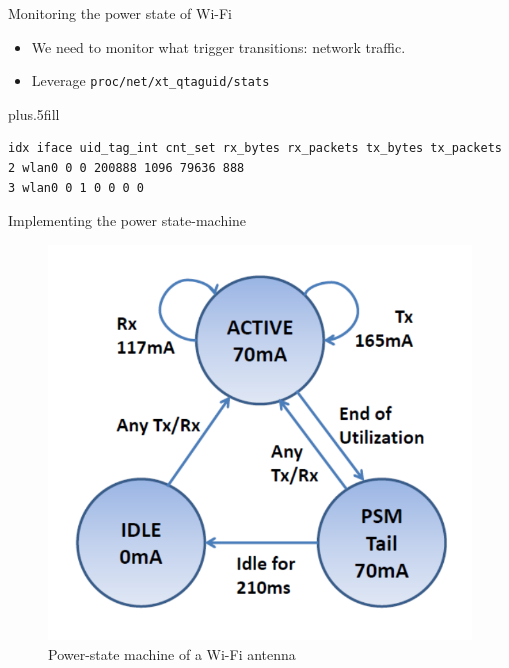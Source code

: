 %
%
\begin{frame}[fragile]{Monitoring the power state of Wi-Fi}
\begin{itemize}
\item We need to monitor what trigger transitions: \alert{network traffic}.
\item Leverage \texttt{proc/net/xt\_qtaguid/stats}
\end{itemize}
\vskip0pt plus.5fill
\begin{lstlisting}
idx iface uid_tag_int cnt_set rx_bytes rx_packets tx_bytes tx_packets
2 wlan0 0 0 200888 1096 79636 888
3 wlan0 0 1 0 0 0 0
\end{lstlisting}
\end{frame}
%
%
\begin{frame}{Implementing the power state-machine}
\begin{figure}
	\includegraphics[height=0.6\textheight]{figures/wifi_statemachine.png} 
	\caption{Power-state machine of a Wi-Fi antenna}
\end{figure}
\end{frame}
